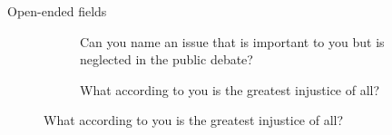 \documentclass[aspectratio=169,xcolor=dvipsnames, 11pt,mathserif]{beamer}
\begin{document}
\begin{frame}{Open-ended fields}
\begin{figure}
\begin{subfigure}{.49\textwidth}
\end{subfigure}
\begin{subfigure}{.49\textwidth}\vspace{-20cm}
  \caption{Can you name an issue that is important to you but is neglected in the public debate?} \vspace{-.3cm}
\end{subfigure}
\begin{subfigure}{.49\textwidth}
  \caption{What according to you is the greatest injustice of all?}%
\end{subfigure}
\end{figure}


\end{frame}
\end{document}

